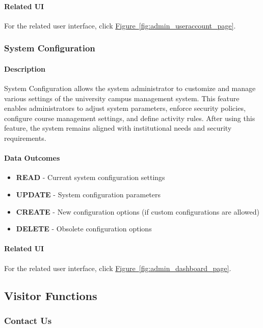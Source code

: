 \documentclass[12pt]{article}
\begin{document}
\paragraph{Related UI}
For the related user interface, click \hyperref[fig:admin_useraccount_page]{Figure~\ref*{fig:admin_useraccount_page}}.

\subsubsection{System Configuration}

\paragraph{Description}
System Configuration allows the system administrator to customize and manage various settings of the university campus management system. This feature enables administrators to adjust system parameters, enforce security policies, configure course management settings, and define activity rules. After using this feature, the system remains aligned with institutional needs and security requirements.

\paragraph{Data Outcomes}
\begin{itemize}
    \item \textbf{READ} - Current system configuration settings
    \item \textbf{UPDATE} - System configuration parameters
    \item \textbf{CREATE} - New configuration options (if custom configurations are allowed)
    \item \textbf{DELETE} - Obsolete configuration options
\end{itemize}

\paragraph{Related UI}
For the related user interface, click \hyperref[fig:admin_dashboard_page]{Figure~\ref*{fig:admin_dashboard_page}}.

\subsection{Visitor Functions}
\subsubsection{Contact Us}
\end{document}
